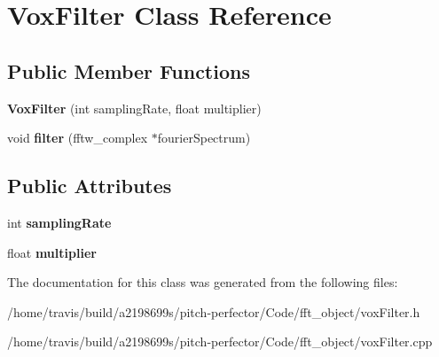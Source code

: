 \hypertarget{classVoxFilter}{\section{Vox\-Filter Class Reference}
\label{classVoxFilter}
}
\subsection*{Public Member Functions}
\begin{DoxyCompactItemize}
\item 
\hypertarget{classVoxFilter_ae0916e10079f346f17ab01a1a9ed55ff}{{\bfseries Vox\-Filter} (int sampling\-Rate, float multiplier)}\label{classVoxFilter_ae0916e10079f346f17ab01a1a9ed55ff}

\item 
\hypertarget{classVoxFilter_affb06db2db581c453d6c233e4e99348c}{void {\bfseries filter} (fftw\-\_\-complex $\ast$fourier\-Spectrum)}\label{classVoxFilter_affb06db2db581c453d6c233e4e99348c}

\end{DoxyCompactItemize}
\subsection*{Public Attributes}
\begin{DoxyCompactItemize}
\item 
\hypertarget{classVoxFilter_a1700ccea93b06ad54b705c3f0e72d5df}{int {\bfseries sampling\-Rate}}\label{classVoxFilter_a1700ccea93b06ad54b705c3f0e72d5df}

\item 
\hypertarget{classVoxFilter_a3001e05ab9d310b7dce2029d3abfa9cd}{float {\bfseries multiplier}}\label{classVoxFilter_a3001e05ab9d310b7dce2029d3abfa9cd}

\end{DoxyCompactItemize}


The documentation for this class was generated from the following files\-:\begin{DoxyCompactItemize}
\item 
/home/travis/build/a2198699s/pitch-\/perfector/\-Code/fft\-\_\-object/vox\-Filter.\-h\item 
/home/travis/build/a2198699s/pitch-\/perfector/\-Code/fft\-\_\-object/vox\-Filter.\-cpp\end{DoxyCompactItemize}
